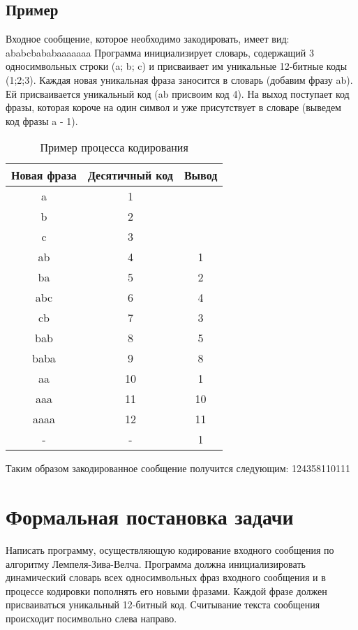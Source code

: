 \documentclass{article}
\begin{document}
\subsection{Пример}

Входное сообщение, которое необходимо закодировать, имеет вид:
ababcbababaaaaaaa
Программа инициализирует словарь, содержащий 3 односимвольных строки (a; b; c) и присваивает им уникальные 12-битные коды (1;2;3). Каждая новая уникальная фраза заносится в словарь (добавим фразу ab). Ей присваивается уникальный код (ab присвоим код 4). На выход поступает код фразы, которая короче на один символ и уже присутствует в словаре (выведем код фразы a - 1).

\begin{table}[h]
\centering
\begin{tabular}{ |c|c|c| } 
 \hline
 Новая фраза & Десятичный код & Вывод \\
 \hline\hline
 a & 1 &  \\
 \hline
 b & 2 &  \\
 \hline
 c & 3 &  \\
 \hline
 ab & 4 & 1 \\
 \hline
 ba & 5 & 2 \\
 \hline
 abc & 6 & 4 \\
 \hline
 cb & 7 & 3 \\
 \hline
 bab & 8 & 5 \\
 \hline
 baba & 9 & 8 \\
 \hline
 aa & 10 & 1 \\
 \hline
 aaa & 11 & 10 \\
 \hline
 aaaa & 12 & 11 \\
 \hline
 - & - & 1 \\
 \hline
\end{tabular}
\caption{\label{tab:widgets}Пример процесса кодирования}
\end{table}

Таким образом закодированное сообщение получится следующим:
124358110111

\section{Формальная постановка задачи}

Написать программу, осуществляющую кодирование входного сообщения по алгоритму Лемпеля-Зива-Велча. Программа должна инициализировать динамический словарь всех односимвольных фраз входного сообщения и в процессе кодировки пополнять его новыми фразами. Каждой фразе должен присваиваться уникальный 12-битный код. Считывание текста сообщения происходит посимвольно слева направо. 
\end{document}
